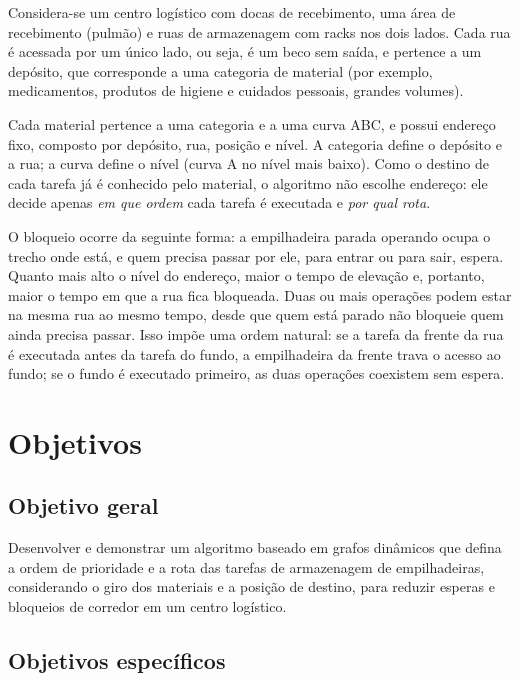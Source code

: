 \documentclass[
	article,
	11pt,
	oneside,
	a4paper,
	english,
	brazil,
	sumario=tradicional
	]{abntex2}
\begin{document}
Considera-se um centro logístico com docas de recebimento, uma área de
recebimento (pulmão) e ruas de armazenagem com racks nos dois lados. Cada rua
é acessada por um único lado, ou seja, é um beco sem saída, e pertence a um
depósito, que corresponde a uma categoria de material (por exemplo,
medicamentos, produtos de higiene e cuidados pessoais, grandes volumes).

Cada material pertence a uma categoria e a uma curva ABC, e possui endereço
fixo, composto por depósito, rua, posição e nível. A categoria define o
depósito e a rua; a curva define o nível (curva A no nível mais baixo). Como o
destino de cada tarefa já é conhecido pelo material, o algoritmo não escolhe
endereço: ele decide apenas \emph{em que ordem} cada tarefa é executada e
\emph{por qual rota}.

O bloqueio ocorre da seguinte forma: a empilhadeira parada operando ocupa o
trecho onde está, e quem precisa passar por ele, para entrar ou para sair,
espera. Quanto mais alto o nível do endereço, maior o tempo de elevação e,
portanto, maior o tempo em que a rua fica bloqueada. Duas ou mais operações
podem estar na mesma rua ao mesmo tempo, desde que quem está parado não
bloqueie quem ainda precisa passar. Isso impõe uma ordem natural: se a tarefa
da frente da rua é executada antes da tarefa do fundo, a empilhadeira da frente
trava o acesso ao fundo; se o fundo é executado primeiro, as duas operações
coexistem sem espera.

\section{Objetivos}
\label{sec:objetivos}

\subsection{Objetivo geral}

Desenvolver e demonstrar um algoritmo baseado em grafos dinâmicos que defina a
ordem de prioridade e a rota das tarefas de armazenagem de empilhadeiras,
considerando o giro dos materiais e a posição de destino, para reduzir esperas
e bloqueios de corredor em um centro logístico.

\subsection{Objetivos específicos}
\end{document}
